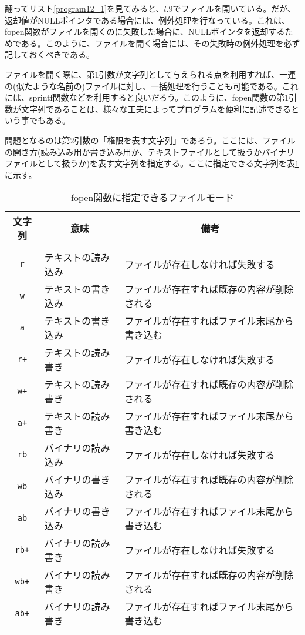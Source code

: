 翻ってリスト\ref{program12_1}を見てみると、$l$.9でファイルを開いている。だが、返却値がNULLポインタである場合には、例外処理を行なっている。これは、fopen関数がファイルを開くのに失敗した場合に、NULLポインタを返却するためである。このように、ファイルを開く場合には、その失敗時の例外処理を必ず記しておくべきである。

ファイルを開く際に、第1引数が文字列として与えられる点を利用すれば、一連の(似たような名前の)ファイルに対し、一括処理を行うことも可能である。これには、sprintf関数などを利用すると良いだろう。このように、fopen関数の第1引数が文字列であることは、様々な工夫によってプログラムを便利に記述できるという事でもある。

問題となるのは第2引数の「権限を表す文字列」であろう。ここには、ファイルの開き方(読み込み用か書き込み用か、テキストファイルとして扱うかバイナリファイルとして扱うか)を表す文字列を指定する。ここに指定できる文字列を表\ref{fopen_mode}に示す。
\begin{table}[h]
\centering
\caption{fopen関数に指定できるファイルモード}\label{fopen_mode}
 \begin{tabular}{|c|l|l|} \hline
  文字列 & \multicolumn{1}{|c|}{意味} & \multicolumn{1}{|c|}{備考} \\ \hline
& & \\[-15.5pt] \hline
  \verb|r| & テキストの読み込み & ファイルが存在しなければ失敗する \\ \hline
  \verb|w| & テキストの書き込み & ファイルが存在すれば既存の内容が削除される \\ \hline
  \verb|a| & テキストの書き込み & ファイルが存在すればファイル末尾から書き込む \\ \hline
  \verb|r+| & テキストの読み書き & ファイルが存在しなければ失敗する \\ \hline
  \verb|w+| & テキストの読み書き & ファイルが存在すれば既存の内容が削除される \\ \hline
  \verb|a+| & テキストの読み書き & ファイルが存在すればファイル末尾から書き込む \\ \hline
  \verb|rb| & バイナリの読み込み & ファイルが存在しなければ失敗する \\ \hline
  \verb|wb| & バイナリの書き込み & ファイルが存在すれば既存の内容が削除される \\ \hline
  \verb|ab| & バイナリの書き込み & ファイルが存在すればファイル末尾から書き込む \\ \hline
  \verb|rb+| & バイナリの読み書き & ファイルが存在しなければ失敗する \\ \hline
  \verb|wb+| & バイナリの読み書き & ファイルが存在すれば既存の内容が削除される \\ \hline
  \verb|ab+| & バイナリの読み書き & ファイルが存在すればファイル末尾から書き込む \\ \hline
 \end{tabular}
\end{table}

